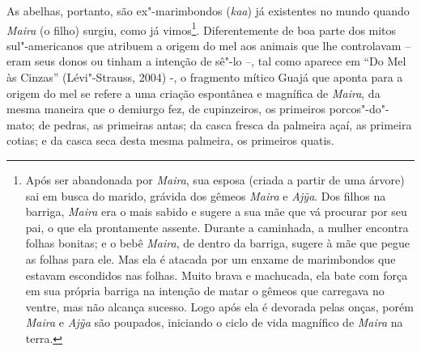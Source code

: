 As abelhas, portanto, são ex"-marimbondos (\emph{kaa}) já existentes no
mundo quando \emph{Maira} (o filho) surgiu, como já vimos\footnote{Após
  ser abandonada por \emph{Maira}, sua esposa (criada a partir de uma
  árvore) sai em busca do marido, grávida dos gêmeos \emph{Maira} e
  \emph{Ajỹa}. Dos filhos na barriga, \emph{Maira} era o mais sabido e
  sugere a sua mãe que vá procurar por seu pai, o que ela prontamente
  assente. Durante a caminhada, a mulher encontra folhas bonitas; e o
  bebê \emph{Maira}, de dentro da barriga, sugere à mãe que pegue as
  folhas para ele. Mas ela é atacada por um enxame de marimbondos que
  estavam escondidos nas folhas. Muito brava e machucada, ela bate com
  força em sua própria barriga na intenção de matar o gêmeos que
  carregava no ventre, mas não alcança sucesso. Logo após ela é devorada
  pelas onças, porém \emph{Maira} e \emph{Ajỹa} são poupados, iniciando
  o ciclo de vida magnífico de \emph{Maira} na terra.}. Diferentemente
de boa parte dos mitos sul"-americanos que atribuem a origem do mel aos
animais que lhe controlavam -- eram seus donos ou tinham a intenção de
sê"-lo --, tal como aparece em ``Do Mel às Cinzas'' (Lévi"-Strauss, 2004) -, o
fragmento mítico Guajá que aponta para a origem do mel se refere a uma
criação espontânea e magnífica de \emph{Maira}, da mesma maneira que o
demiurgo fez, de cupinzeiros, os primeiros porcos"-do"-mato; de pedras, as
primeiras antas; da casca fresca da palmeira açaí, as primeira cotias; e
da casca seca desta mesma palmeira, os primeiros quatis.

